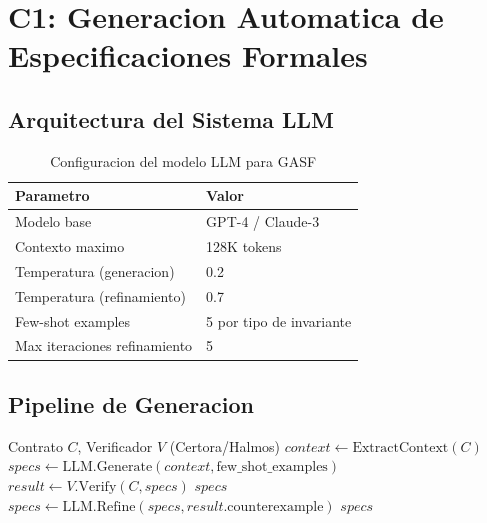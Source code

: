 \documentclass[11pt]{article}
\theoremstyle{definition}
\theoremstyle{plain}
\theoremstyle{remark}
\begin{document}
\section{C1: Generacion Automatica de Especificaciones Formales}
\label{sec:gasf}

\subsection{Arquitectura del Sistema LLM}

\begin{table}[H]
\centering
\caption{Configuracion del modelo LLM para GASF}
\label{tab:llm_config}
\begin{tabular}{ll}
\toprule
\textbf{Parametro} & \textbf{Valor} \\
\midrule
Modelo base & GPT-4 / Claude-3 \\
Contexto maximo & 128K tokens \\
Temperatura (generacion) & 0.2 \\
Temperatura (refinamiento) & 0.7 \\
Few-shot examples & 5 por tipo de invariante \\
Max iteraciones refinamiento & 5 \\
\bottomrule
\end{tabular}
\end{table}

\subsection{Pipeline de Generacion}

\begin{algorithm}[H]
\caption{GASF: Generacion de Especificaciones}
\label{alg:gasf}
\begin{algorithmic}[1]
\Require Contrato $C$, Verificador $V$ (Certora/Halmos)
\State $context \gets \text{ExtractContext}(C)$ 
\State $specs \gets \text{LLM.Generate}(context, \text{few\_shot\_examples})$
    \State $result \gets V.\text{Verify}(C, specs)$
        \State \Return $specs$
    \Else
        \State $specs \gets \text{LLM.Refine}(specs, result.\text{counterexample})$
    \EndIf
\EndFor
\State \Return $specs$ 
\end{algorithmic}
\end{algorithm}
\end{document}
